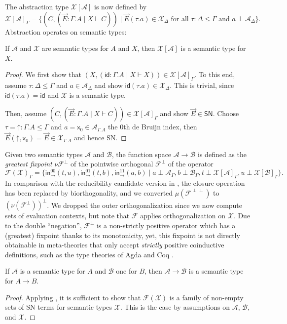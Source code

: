 \documentclass[a4paper,USenglish,cleveref, autoref, thm-restate]{lipics-v2019}
\newcommand{\tid}{\mathsf{id}}
\newcommand{\x}{\mathsf{x}}
\newcommand{\tin}{\ensuremath{\mathsf{in}}}
\newcommand{\inn}[2]{\ensuremath{\tin_{#1}^{#2}}}
\newcommand{\A}{\mathcal{A}}
\newcommand{\B}{\mathcal{B}}
\newcommand{\F}{\mathcal{F}}
\newcommand{\X}{\mathcal{X}}
\newcommand{\SN}{\mathsf{SN}}
\newcommand{\up}{\mathord{\uparrow}}
\begin{document}
The abstraction type $\X[\A]$ is now defined by
\[
  \X[\A]_\Gamma =
  \{ (C, (\vec E : \Gamma.A \mid X \vdash C))
     \mid \vec E (\tau.a) \in \X_\Delta
     \mbox{ for all } \tau : \Delta \leq \Gamma
     \mbox{ and } a \perp \A_\Delta
  \}
  .
\]
Abstraction operates on semantic types:
\begin{lemma}
  \label{lem:absrev}
  If $\A$ and $\X$ are semantic types for $A$ and $X$, then $\X[\A]$
  is a semantic type for $X$.
\end{lemma}
\begin{proof}
  We first show that
  $(X, (\tid : \Gamma.A \mid X \vdash X)) \in \X[\A]_\Gamma$.
  To this end, assume $\tau : \Delta \leq \Gamma$ and $a \in
  \A_\Delta$ and show $\tid(\tau.a) \in \X_\Delta$.  This is trivial,
  since $\tid(\tau.a) = \tid$ and $\X$ is a semantic type.

  Then, assume $(C, (\vec E : \Gamma.A \mid X \vdash C)) \in
  \X[\A]_\Gamma$ and show $\vec E \in \SN$.
  Choose $\tau = \up : \Gamma.A \leq \Gamma$ and $a = \x_0 \in
  \A_{\Gamma.A}$ the 0th de Bruijn index, then $\vec E (\up,\x_0) =
  \vec E \in \X_{\Gamma.A}$ and hence SN.
\end{proof}
Given two semantic types $\A$ and $\B$, the function space $\A \to \B$
is defined as the \emph{greatest fixpoint} $\nu \F^\perp$ of the
pointwise orthogonal $\F^\perp$ of the operator
\[
  \F(\X)_\Gamma =
  \{
    \inn\to{00}(t,u),
    \inn\to{01}(t,b),
    \inn\to{11}(a,b) \mid
      a \perp \A_\Gamma,
      b \perp \B_\Gamma,
      t \perp \X[\A]_\Gamma,
      u \perp \X[\B]_\Gamma
  \}
  .
\]
In comparison with the reducibility candidate version in
, the closure operation has been replaced by
biorthogonality, and we converted $\mu(\F^{\perp\perp})$
to $(\nu(\F^\perp))^\perp$.  We dropped the outer orthogonalization since
we now compute sets of evaluation contexts, but note that $\F$ applies
orthogonalization on $\X$.
Due to the double ``negation'', $\F^\perp$ is a non-strictly positive
operator which has a (greatest) fixpoint thanks to its monotonicity,
yet, this fixpoint is not directly obtainable in meta-theories that
only accept \emph{strictly} positive coinductive definitions, such as
the type theories of Agda \cite{agda:261} and Coq \cite{coq:8120}.

\begin{lemma}
  \label{lem:funrev}
  If $\A$ is a semantic type for $A$ and $\B$ one for $B$, then $\A
  \to \B$ is a semantic type for $A \to B$.
\end{lemma}
\begin{proof}
  Applying ,
  it is sufficient to show that $\F(\X)$ is a family of non-empty sets
  of SN terms for semantic types $\X$.
  This is the case by assumptions on $\A$, $\B$, and $\X$.
\end{proof}
\end{document}
